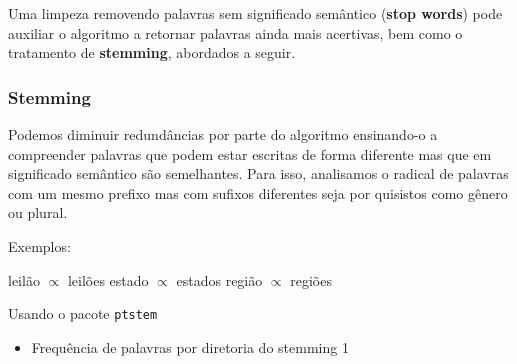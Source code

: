 \documentclass[]{article}
\newenvironment{Shaded}{\begin{snugshade}}{\end{snugshade}}
\newcommand{\KeywordTok}[1]{\textcolor[rgb]{0.13,0.29,0.53}{\textbf{#1}}}
\newcommand{\DataTypeTok}[1]{\textcolor[rgb]{0.13,0.29,0.53}{#1}}
\newcommand{\StringTok}[1]{\textcolor[rgb]{0.31,0.60,0.02}{#1}}
\newcommand{\OtherTok}[1]{\textcolor[rgb]{0.56,0.35,0.01}{#1}}
\newcommand{\OperatorTok}[1]{\textcolor[rgb]{0.81,0.36,0.00}{\textbf{#1}}}
\newcommand{\NormalTok}[1]{#1}
\providecommand{\tightlist}{%
  \setlength{\itemsep}{0pt}\setlength{\parskip}{0pt}}
\begin{document}
Uma limpeza removendo palavras sem significado semântico (\textbf{stop
words}) pode auxiliar o algoritmo a retornar palavras ainda mais
acertivas, bem como o tratamento de \textbf{stemming}, abordados a
seguir.

\subsubsection{Stemming}\label{stemming}

Podemos diminuir redundâncias por parte do algoritmo ensinando-o a
compreender palavras que podem estar escritas de forma diferente mas que
em significado semântico são semelhantes. Para isso, analisamos o
radical de palavras com um mesmo prefixo mas com sufixos diferentes seja
por quisistos como gênero ou plural.

Exemplos:

leilão \(\propto\) leilões estado \(\propto\) estados região \(\propto\)
regiões

Usando o pacote \texttt{ptstem}

\begin{Shaded}
\end{Shaded}

\begin{itemize}
\tightlist
\item
  Frequência de palavras por diretoria do stemming 1
\end{itemize}

\begin{Shaded}
\end{Shaded}
\end{document}
